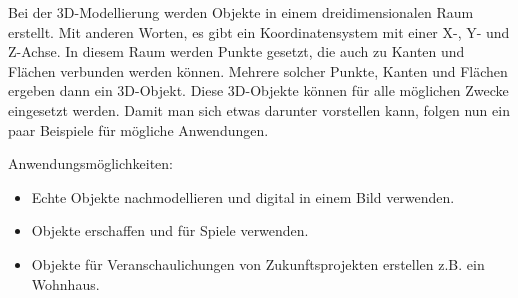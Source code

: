 Bei der 3D-Modellierung werden Objekte in einem dreidimensionalen Raum erstellt. Mit anderen Worten, es gibt ein Koordinatensystem mit einer X-, Y- und Z-Achse.
In diesem Raum werden Punkte gesetzt, die auch zu Kanten und Flächen verbunden werden können. Mehrere solcher Punkte, Kanten und Flächen ergeben dann ein 3D-Objekt.
Diese 3D-Objekte können für alle möglichen Zwecke eingesetzt werden. Damit man sich etwas darunter vorstellen kann, folgen nun ein paar Beispiele für
mögliche Anwendungen.

Anwendungsmöglichkeiten:
\begin{itemize}
    \item Echte Objekte nachmodellieren und digital in einem Bild verwenden.
    \item Objekte erschaffen und für Spiele verwenden.
    \item Objekte für Veranschaulichungen von Zukunftsprojekten erstellen z.B. ein Wohnhaus.
\end{itemize}

